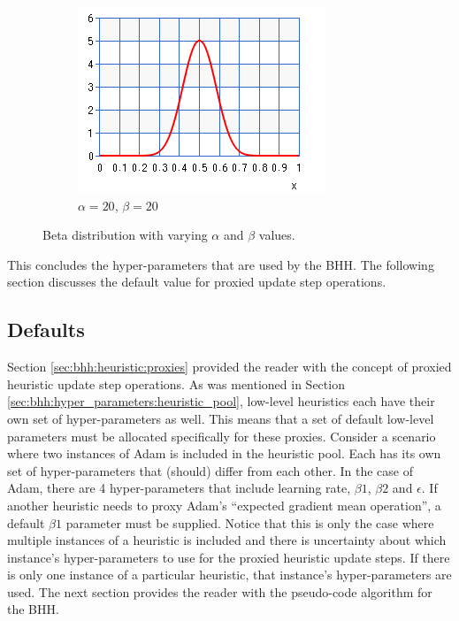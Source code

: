\begin{figure}[htbp]
\begin{subfigure}{0.5\textwidth}
    	\centering
        \includegraphics[width=\textwidth]{images/beta_20_20.png}
        \caption{$\alpha=20$, $\beta=20$}
        \label{sec:bhh:hyper_parameters:normalisation_beta_20_20}
    \end{subfigure}
    \par\bigskip
    \caption{Beta distribution with varying $\alpha$ and $\beta$ values.}
    \label{sec:bhh:hyper_parameters:discounted_rewards:normalisation}
\end{figure}

This concludes the hyper-parameters that are used by the \ac{BHH}. The following section discusses the default value for proxied update step operations.

\subsection{Defaults}
\label{sec:bhh:hyper_parameters:defaults}

Section \ref{sec:bhh:heuristic:proxies} provided the reader with the concept of proxied heuristic update step operations. As was mentioned in Section \ref{sec:bhh:hyper_parameters:heuristic_pool}, low-level heuristics each have their own set of hyper-parameters as well. This means that a set of default low-level parameters must be allocated specifically for these proxies. Consider a scenario where two instances of \ac{Adam} is included in the heuristic pool. Each has its own set of hyper-parameters that (should) differ from each other. In the case of \ac{Adam}, there are 4 hyper-parameters that include learning rate, $\beta1$, $\beta2$ and $\epsilon$. If another heuristic needs to proxy \ac{Adam}'s ``expected gradient mean operation'', a default $\beta1$ parameter must be supplied. Notice that this is only the case where multiple instances of a heuristic is included and there is uncertainty about which instance's hyper-parameters to use for the proxied heuristic update steps. If there is only one instance of a particular heuristic, that instance's hyper-parameters are used. The next section provides the reader with the pseudo-code algorithm for the \ac{BHH}.

